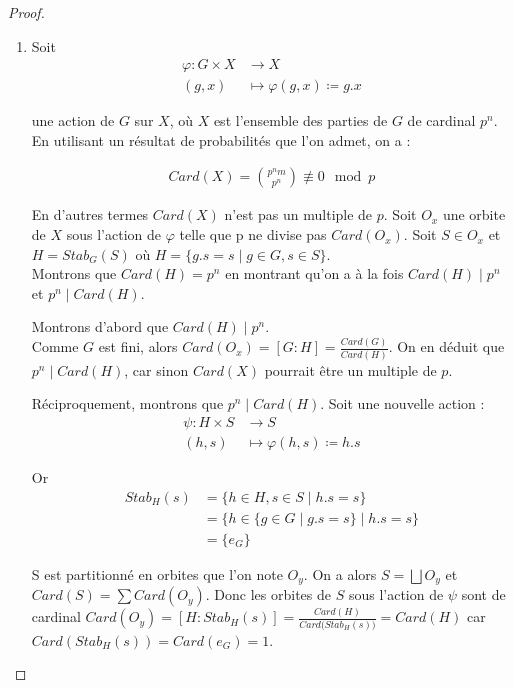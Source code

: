 \documentclass[french]{article}
\theoremstyle{definition}
\theoremstyle{plain}
\theoremstyle{plain}
\theoremstyle{plain}
\theoremstyle{plain}
\theoremstyle{plain}
\begin{document}
\begin{proof}
	\begin{enumerate}[label={\upshape(\roman*)}]
		\item 
Soit
\begin{align*}
	\varphi : G \times X &\to X \\
	(g,x) &\mapsto \varphi(g,x) \coloneq g.x
\end{align*}

une action de \( G \) sur \( X \), où \( X \) est l'ensemble des parties de \( G \) de cardinal \( p^{n} \). En utilisant un résultat de probabilités que l'on admet, on a :

\begin{align*}
	Card(X) = \binom{p^{n}m}{p^{n}} \not\equiv 0 \mod  p 
\end{align*}


En d'autres termes \( Card(X) \) n'est pas un multiple de \( p \).
Soit \( O_{x} \) une orbite de \( X \) sous l'action de \( \varphi \) telle que  p ne divise pas \( Card(O_{x}) \). Soit \( S \in O_{x} \) et \( H = Stab_{G}({S}) \) où 
\( H = \{ g.s = s \mid g \in G, s \in S \} \). \\
Montrons que \( Card(H) = p^{n} \) en montrant qu'on a à la fois \( Card(H) \mid p^{n} \) et \( p^{n} \mid Card(H) \).

\par Montrons d'abord que \( Card(H) \mid p^{n} \). \\ 
Comme \( G \) est fini, alors \( Card(O_{x}) = [G : H]  = \frac{Card(G)}{Card(H)} \).
On en déduit que \( p^{n} \mid Card(H) \), car sinon \( Card(X) \) pourrait être un multiple de \( p \).

\par Réciproquement, montrons que \( p^{n} \mid Card(H) \). Soit une nouvelle action :
\begin{align*}
	\psi : H \times S &\to S \\
	(h,s) &\mapsto \varphi(h,s) \coloneq h.s
\end{align*}

Or 
\begin{align*}
	Stab_{H}({s}) &= \{ h \in H, s \in S \mid h.s = s \} \\ 
	&= \{ h \in \{g \in G \mid g.s = s \} \mid h.s = s \} \\
	&= \{e_{G}\} 
\end{align*}


S est partitionné en orbites que l'on note \( O_y \). On a alors \( S = \bigsqcup O_{y} \) et 
\( Card(S) = \sum Card(O_{y}) \).
Donc les orbites de \( S \) sous l'action de \( \psi \) sont de cardinal \( Card(O_y) = [H : Stab_{H}({s}) ] = \frac{Card(H)}{Card({Stab_{H}({s}))}} = Card(H) \) car \( Card(Stab_{H}({s})) = Card(e_{G}) = 1 \).


\end{enumerate}
\end{proof}
\end{document}
